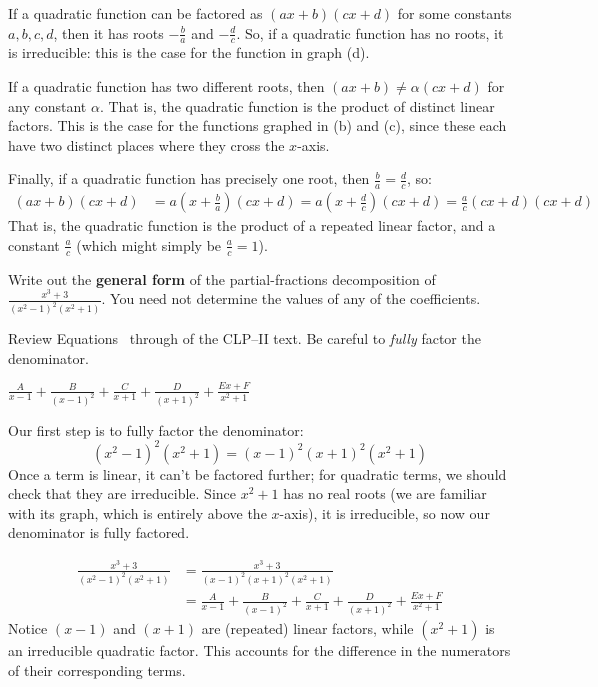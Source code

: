 \begin{solution}
If a quadratic function can be factored as $(ax+b)(cx+d)$ for some constants $ a,b,c,d$, then it has roots $-\frac{b}{a}$ and $-\frac{d}{c}$. So, if a quadratic function has no roots, it is irreducible: this is the case for the function in graph (d).

If a quadratic function has  two different roots, then $(ax+b) \neq \alpha(cx+d)$ for any constant $\alpha$. That is, the quadratic function is the product of distinct linear factors. This is the case for the functions graphed in (b) and (c), since these each have two distinct places where they cross the $x$-axis.

Finally, if a quadratic function has precisely one root, then $\frac{b}{a}=\frac{d}{c}$, so:
\begin{align*}
(ax+b)(cx+d)&=a(x+\tfrac{b}{a})(cx+d) = a(x+\tfrac{d}{c})(cx+d) = \tfrac{a}{c}(cx+d)(cx+d)
\end{align*}
That is, the quadratic function is the product of a repeated linear factor, and  a constant $\frac{a}{c}$ (which might simply be $\frac{a}{c}=1$).
\end{solution}


\begin{Mquestion}[2016Q4]
Write out the \textbf{general form} of the partial-fractions
decomposition of
$
\displaystyle\frac{x^3+3}{(x^2-1)^2(x^2+1)}
$.
You need not determine the values of any of the coefficients.
\end{Mquestion}

\begin{hint}
Review Equations~ through 
of the %
CLP--II text.
Be careful to \emph{fully} factor the denominator.
\end{hint}

\begin{answer}
$\displaystyle\frac{A}{x-1}+\frac{B}{(x-1)^2}+\frac{C}{x+1}+\frac{D}{(x+1)^2}+\frac{Ex+F}{x^2+1} $
\end{answer}

\begin{solution}
Our first step is to fully factor the denominator:
\[(x^2-1)^2(x^2+1) = (x-1)^2(x+1)^2(x^2+1)\]
Once a term is linear, it can't be factored further; for quadratic terms, we should check that they are irreducible. Since $x^2+1$ has no real roots (we are familiar with its graph, which is entirely above the $x$-axis), it is irreducible, so now our denominator is fully factored.

\begin{align*}
\frac{x^3+3}{(x^2-1)^2(x^2+1)}
&=\frac{x^3+3}{(x-1)^2(x+1)^2(x^2+1)}\\
&=\frac{A}{x-1}+\frac{B}{(x-1)^2}+\frac{C}{x+1}+\frac{D}{(x+1)^2}+\frac{Ex+F}{x^2+1}
\end{align*}
Notice $(x-1)$ and $(x+1)$ are (repeated) linear factors, while $(x^2+1)$  is an irreducible quadratic factor. This accounts for the difference in the numerators of their corresponding terms.
\end{solution}

